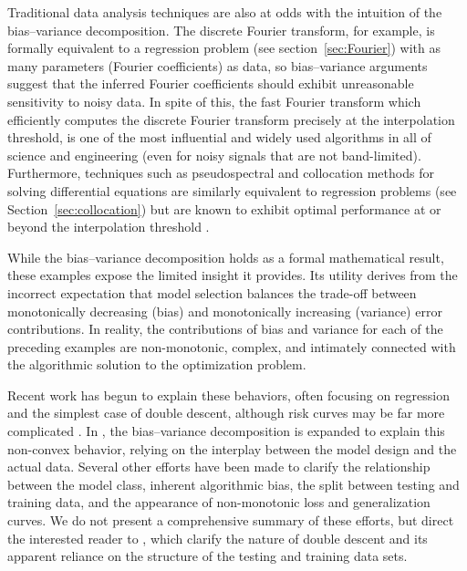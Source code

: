 \documentclass[twocolumn,aps,prx,superscriptaddress,10pt]{revtex4-2}
\newcommand{\0}{\bm{0}}
\begin{document}
Traditional data analysis techniques are also at odds with the intuition of the bias--variance decomposition.
The discrete Fourier transform, for example, is formally equivalent to a regression problem (see section~\ref{sec:Fourier}) with as many parameters (Fourier coefficients) as data, so
bias--variance arguments suggest that the inferred Fourier coefficients should exhibit unreasonable sensitivity to noisy data.
In spite of this, the fast Fourier transform which efficiently computes the discrete Fourier transform precisely at the interpolation threshold, is one of the most influential and widely used algorithms in all of science and engineering (even for noisy signals that are not band-limited).
Furthermore, techniques such as pseudospectral and collocation methods for solving differential equations are similarly equivalent to regression problems (see Section~\ref{sec:collocation}) but are known to exhibit optimal performance at or beyond the interpolation threshold \cite{boyd2001chebyshev}.

While the bias--variance decomposition holds as a formal mathematical result, these examples expose the limited insight it provides.
Its utility derives from the incorrect expectation that model selection balances the trade-off between monotonically decreasing (bias) and monotonically increasing (variance) error contributions.
In reality, the contributions of bias and variance for each of the preceding examples are non-monotonic, complex, and intimately connected with the algorithmic solution to the optimization problem.

Recent work has begun to explain these behaviors, often focusing on regression and the simplest case of double descent, although risk curves may be far more complicated \cite{BelkinMultiple}.
In \cite{AdlamPennington2020,schaeffer2023double}, the bias--variance decomposition is expanded to explain this non-convex behavior, relying on the interplay between the model design and the actual data.
Several other efforts have been made to clarify the relationship between the model class, inherent algorithmic bias, the split between testing and training data, and the appearance of non-monotonic loss and generalization curves.
We do not present a comprehensive summary of these efforts, but direct the interested reader to \cite{neal2018modern,dAscoliRefinettiBiroliKrzakala2020,NakkiranKaplunBansalYangBarakSutskever2021,LafonThomas2024}, 
which clarify the nature of double descent and its apparent reliance on the structure of the testing and training data sets.
\end{document}
